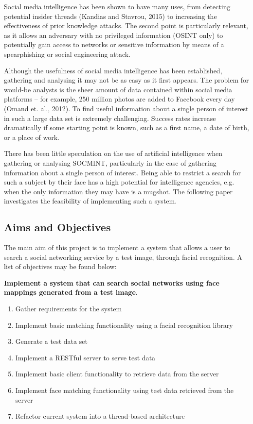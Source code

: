 \documentclass[12pt]{article}
\begin{document}
Social media intelligence has been shown to have many uses, from detecting potential insider threads (Kandias and Stavrou, 2015) to increasing the effectiveness of prior knowledge attacks. The second point is particularly relevant, as it allows an adversary with no privileged information (OSINT only) to potentially gain access to networks or sensitive information by means of a spearphishing or social engineering attack.

Although the usefulness of social media intelligence has been established, gathering and analysing it may not be as easy as it first appears. The problem for would-be analysts is the sheer amount of data contained within social media platforms – for example, 250 million photos are added to Facebook every day (Omand et. al., 2012). To find useful information about a single person of interest in such a large data set is extremely challenging. Success rates increase dramatically if some starting point is known, such as a first name, a date of birth, or a place of work.

There has been little speculation on the use of artificial intelligence when gathering or analysing SOCMINT, particularly in the case of gathering information about a single person of interest. Being able to restrict a search for such a subject by their face has a high potential for intelligence agencies, e.g. when the only information they may have is a mugshot. The following paper investigates the feasibility of implementing such a system.

\subsection{Aims and Objectives}
The main aim of this project is to implement a system that allows a user to search a social networking service by a test image, through facial recognition. A list of objectives may be found below:

\begin{center}
\textbf{Implement a system that can search social networks using face mappings generated from a test image.}

\begin{enumerate}
\item{Gather requirements for the system}
\item{Implement basic matching functionality using a facial recognition library}
\item{Generate a test data set}
\item{Implement a RESTful server to serve test data}
\item{Implement basic client functionality to retrieve data from the server}
\item{Implement face matching functionality using test data retrieved from the server}
\item{Refactor current system into a thread-based architecture}

\end{enumerate}
\end{center}
\end{document}
